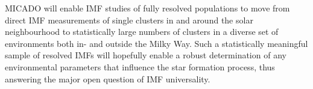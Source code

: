 MICADO will enable IMF studies of fully resolved populations to move from direct IMF measurements of single clusters in and around the solar neighbourhood to statistically large numbers of clusters in a diverse set of environments both in- and outside the Milky Way. Such a statistically meaningful sample of resolved IMFs will hopefully enable a robust determination of any environmental parameters that influence the star formation process, thus answering the major open question of IMF universality.

% 









    
    





